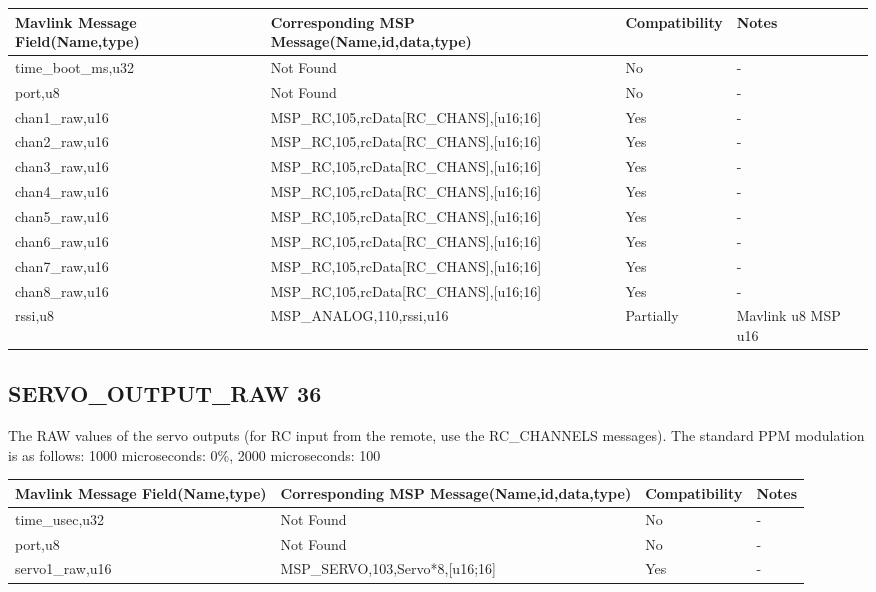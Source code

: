 {
\centering
\begin{tabular}{ |p{4cm  } |p{7cm} | p{2cm}|m{5em}|}
\hline
Mavlink Message Field(Name,type)&Corresponding MSP Message(Name,id,data,type)& Compatibility & Notes\\
\hline
time\_boot\_ms,u32 & Not Found & No & - \\
\hline
port,u8 & Not Found & No & - \\
\rowcolor{green}
\hline
chan1\_raw,u16 & MSP\_RC,105,rcData[RC\_CHANS],[u16;16]& Yes  & - \\
\rowcolor{green}
\hline
chan2\_raw,u16 & MSP\_RC,105,rcData[RC\_CHANS],[u16;16]& Yes  & - \\
\rowcolor{green}
\hline
chan3\_raw,u16 & MSP\_RC,105,rcData[RC\_CHANS],[u16;16]& Yes  & - \\
\rowcolor{green}
\hline
chan4\_raw,u16 & MSP\_RC,105,rcData[RC\_CHANS],[u16;16]& Yes  & - \\
\rowcolor{green}
\hline
chan5\_raw,u16 & MSP\_RC,105,rcData[RC\_CHANS],[u16;16]& Yes  & - \\
\rowcolor{green}
\hline
chan6\_raw,u16 & MSP\_RC,105,rcData[RC\_CHANS],[u16;16]& Yes  & - \\
\rowcolor{green}
\hline
chan7\_raw,u16 & MSP\_RC,105,rcData[RC\_CHANS],[u16;16]& Yes  & - \\
\rowcolor{green}
\hline
chan8\_raw,u16 & MSP\_RC,105,rcData[RC\_CHANS],[u16;16]& Yes  & - \\
\rowcolor{lightgray}
\hline
rssi,u8 & MSP\_ANALOG,110,rssi,u16& Partially  & Mavlink u8 MSP u16 \\

\end{tabular}
}

\cleardoublepage






\subsection{SERVO\_OUTPUT\_RAW 36} 
The RAW values of the servo outputs (for RC input from the remote, use the RC\_CHANNELS messages). The standard PPM modulation is as follows: 1000 microseconds: 0\%, 2000 microseconds: 100%

{
\centering
\begin{tabular}{ |p{4cm  } |p{7cm} | p{2cm}|m{5em}|}
\hline
Mavlink Message Field(Name,type)&Corresponding MSP Message(Name,id,data,type)& Compatibility & Notes\\
\hline
time\_usec,u32 & Not Found & No & - \\
\hline
port,u8 & Not Found & No & - \\
\rowcolor{green}
\hline
servo1\_raw,u16 & MSP\_SERVO,103,Servo*8,[u16;16]& Yes  & - \\

\end{tabular}
}

